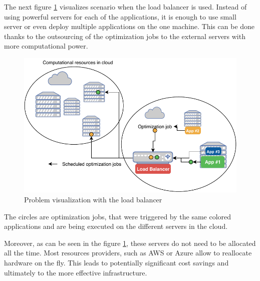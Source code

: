 The next figure \ref{fig:problem-with-load-balancer} visualizes scenario when the load balancer is used.
Instead of using powerful servers for each of the applications,
it is enough to use small server or even deploy multiple applications on the one machine.
This can be done thanks to the outsourcing of the optimization jobs to the external servers with more computational power.
\begin{figure}[ht] 
    \includegraphics[width=\textwidth]{i_problem_scheme_jobs.pdf} 
    \centering
    \caption{Problem visualization with the load balancer}
    \label{fig:problem-with-load-balancer}
\end{figure}
The circles are optimization jobs,
that were triggered by the same colored applications
and are being executed on the different servers in the cloud.

Moreover,
as can be seen in the figure \ref{fig:problem-with-load-balancer},
these servers do not need to be allocated all the time.
Most resources providers, 
such as AWS\cite{awsReference} or Azure\cite{azureReference} allow to reallocate hardware on the fly.
This leads to potentially significant cost savings 
and ultimately to the more effective infrastructure.

\newpage


